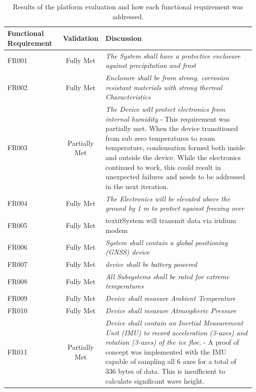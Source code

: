 \begin{table}[H]
    \centering
    \caption{Results of the platform evaluation and how each functional requirement was addressed.}
    \begin{tabular}{|m{}|c| m{}|}
    \hline
     Functional Requirement   &  Validation & Discussion\\
     \hline
     FR001 & Fully Met & \textit{The System shall have a protective enclosure against precipitation and frost}\\
          \hline
     FR002 & Fully Met &\textit{Enclosure shall be from strong, corrosion resistant materials with strong thermal Characteristics}\\
          \hline
     FR003 & Partially Met& \textit{The Device will protect electronics from internal humidity} - This requirement was partially met. When the device transitioned from sub zero temperatures to room temperature, condensation formed both inside and outside the device. While the electronics continued to work, this could result in unexpected failures and needs to be addressed in the next iteration.\\
          \hline
     FR004 & Fully Met & \textit{The Electronics will be elevated above the ground by 1 m to protect against freezing over}\\
          \hline
     FR005 &Fully Met & textit{System will transmit data via iridium modem}\\
          \hline
     FR006 &  Fully Met &\textit{System shall contain a global positioning (GNSS) device}\\
          \hline
     FR007 & Fully Met &\textit{device shall be battery powered} \\
          \hline
     FR008 & Fully Met &\textit{All Subsystems shall be rated for extreme temperatures}\\
          \hline
     FR009 & Fully Met& \textit{Device shall measure Ambient Temperature}\\
          \hline
     FR010 & Fully Met & \textit{Device shall measure Atmospheric Pressure}\\
          \hline
     FR011 & Partially Met &\textit{Device shall contain an Inertial Measurement Unit (IMU) to record acceleration (3-axes) and rotation (3-axes) of the ice floe.} - A proof of concept was implemented with the IMU capable of sampling all 6 axes for a total of 336 bytes of data. This is insufficient to calculate significant wave height.\\
          \hline

\end{tabular}
\end{table}
